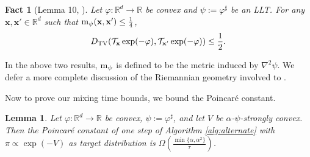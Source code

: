 \documentclass[11pt]{article}
\newtheorem{lemma}{Lemma}
\newtheorem{fact}{Fact}
\newcommand{\defeq}{:=}
\newcommand{\R}{\mathbb{R}}
\newcommand{\0}{\mathbf{0}}
\newcommand{\1}{\mathbf{1}}
\newcommand{\vx}{\mathbf{x}}
\newcommand{\tilt}{\mathcal{T}}
\newcommand{\vhi}{\varphi}
\newcommand{\dtv}{D_{\textup{TV}}}
\begin{document}
\begin{fact}[Lemma 10, \cite{GopiLLST25}]\label{fact:lem10_gllst}
Let $\vhi: \R^d \to \R$ be convex and $\psi \defeq \vhi^\sharp$ be an LLT. For any $\vx,\vx'\in \R^d$ such that $\textup{m}_\psi(\vx,\vx')\le \frac14$, \[
    \dtv(\tilt_\vx\exp(-\vhi),\tilt_{\vx'}\exp(-\vhi))\le\frac{1}{2}.
    \]
\end{fact}
In the above two results, $\textup{m}_\psi$ is defined to be the metric induced by $\nabla^2\psi$. We defer a more complete discussion of the Riemannian geometry involved to \cite{GopiLLST25}.

Now to prove our mixing time bounds, we bound the Poincar\'e constant.
\begin{lemma}\label{lem:pi_constant_by_conductance}
Let $\vhi: \R^d \to \R$ be convex, $\psi \defeq \vhi^\sharp$, and let $V$ be $\alpha$-$\psi$-strongly convex.  Then the Poincar\'e constant of one step of Algorithm \ref{alg:alternate} with $\pi\propto \exp(-V)$ as target distribution is $\Omega(\frac{\min\{\alpha, \alpha^2\}}\tau )$.
\end{lemma}
\end{document}

